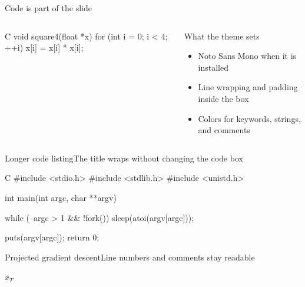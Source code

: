 \documentclass[aspectratio=169]{beamer}
\begin{document}
\begin{frame}[fragile=singleslide]{Code is part of the slide}
  \begin{columns}[T,onlytextwidth]
      \begin{cookiecode}[title=Scalar C]{C}
void square4(float *x) {
  for (int i = 0; i < 4; ++i) {
    x[i] = x[i] * x[i];
  }
}
      \end{cookiecode}

      \begin{block}{What the theme sets}
        \begin{itemize}
          \item Noto Sans Mono when it is installed
          \item Line wrapping and padding inside the box
          \item Colors for keywords, strings, and comments
        \end{itemize}
      \end{block}

       \hspace{.25em}
  \end{columns}
\end{frame}

\begin{frame}[fragile=singleslide]{Longer code listing}{The title wraps without changing the code box}
  \begin{cookiecode}[title=Sleep sort sketch]{C}
#include <stdio.h>
#include <stdlib.h>
#include <unistd.h>

int main(int argc, char **argv) {
  while (--argc > 1 && !fork())
    sleep(atoi(argv[argc]));

  puts(argv[argc]);
  return 0;
}
  \end{cookiecode}
\end{frame}

\begin{frame}{Projected gradient descent}{Line numbers and comments stay readable}
  \begin{algorithm}[H]
    \caption{Projected gradient descent}
    \Return $x_T$\;
  \end{algorithm}
\end{frame}
\end{document}
